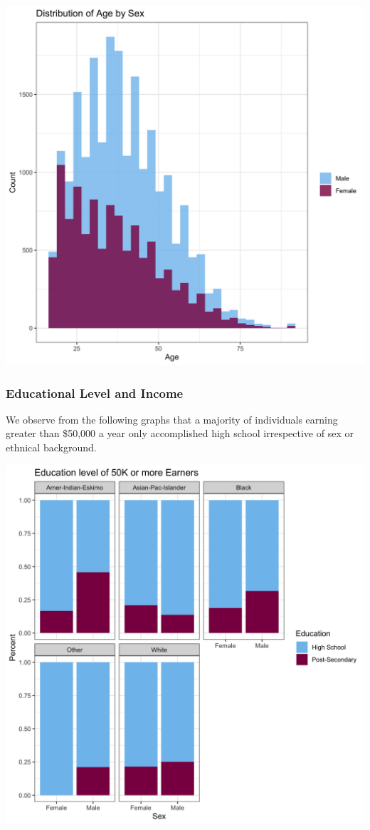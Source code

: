 \documentclass[]{article}
\begin{document}
\includegraphics{../images/Plot_1_Distribution_of_Age_by_Sex.png}

\hypertarget{educational-level-and-income}{%
\subsubsection{Educational Level and
Income}\label{educational-level-and-income}}

We observe from the following graphs that a majority of individuals
earning greater than \$50,000 a year only accomplished high school
irrespective of sex or ethnical background.

\includegraphics{../images/Plot_2_Education_Level_of_50K_or_more_Earners.png}
\end{document}
